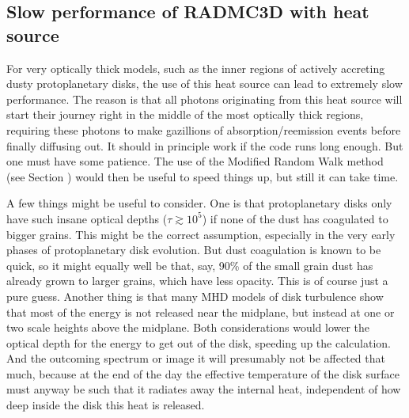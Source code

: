\documentclass[letterpaper,10pt,english]{sphinxmanual}
\begin{document}
\subsection{Slow performance of RADMC\sphinxhyphen{}3D with heat source}
\label{\detokenize{stars:slow-performance-of-radmc-3d-with-heat-source}}
For very optically thick models, such as the inner regions of actively
accreting dusty protoplanetary disks, the use of this heat source can lead
to extremely slow performance. The reason is that all photons originating
from this heat source will start their journey right in the middle of the
most optically thick regions, requiring these photons to make gazillions of
absorption/re\sphinxhyphen{}emission events before finally diffusing out. It should in
principle work if the code runs long enough. But one must have some
patience. The use of the Modified Random Walk method (see Section
{\hyperref[\detokenize{dustradtrans:sec-modrandwalk}]{}}) would then be useful to speed things up, but still it
can take time.

A few things might be useful to consider. One is that protoplanetary disks
only have such insane optical depths (\(\tau\gtrsim 10^5\)) if none of the
dust has coagulated to bigger grains. This might be the correct assumption,
especially in the very early phases of protoplanetary disk evolution. But
dust coagulation is known to be quick, so it might equally well be that,
say, 90\% of the small grain dust has already grown to larger grains, which
have less opacity. This is of course just a pure guess. Another thing is
that many MHD models of disk turbulence show that most of the energy is
not released near the midplane, but instead at one or two scale heights
above the midplane. Both considerations would lower the optical depth for
the energy to get out of the disk, speeding up the calculation. And
the outcoming spectrum or image it will presumably not be affected that
much, because at the end of the day the effective temperature of the disk
surface must anyway be such that it radiates away the internal heat,
independent of how deep inside the disk this heat is released.
\end{document}
